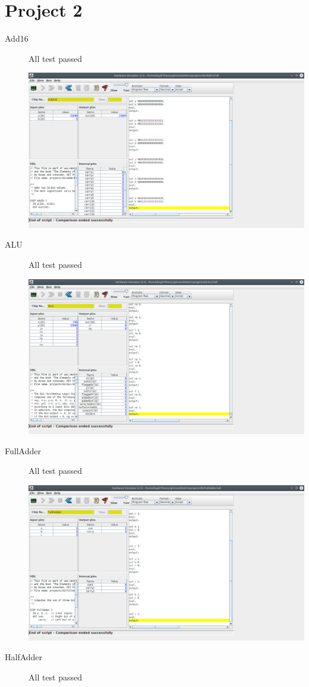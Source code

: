 \documentclass[titlepage]{article}
\begin{document}
\section{Project 2}

\begin{description}
  \item[Add16]{
    All test passed

    \includegraphics[width=.9\textwidth]{02/Add16.png}
  }
  \item[ALU]{
    All test passed

    \includegraphics[width=.9\textwidth]{02/ALU.png}
  }
  \item[FullAdder]{
    All test passed

    \includegraphics[width=.9\textwidth]{02/FullAdder.png}
  }
  \item[HalfAdder]{
    All test passed

}
\end{description}
\end{document}
